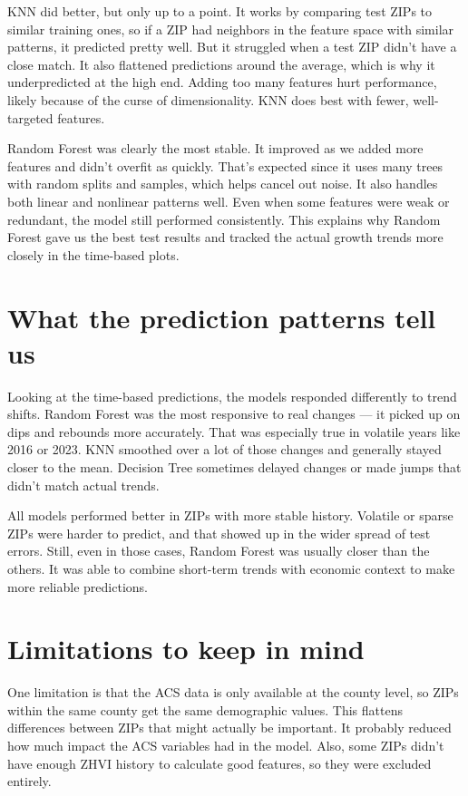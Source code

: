 KNN did better, but only up to a point. It works by comparing test ZIPs to similar training ones, so if a ZIP had neighbors in the feature space with similar patterns, it predicted pretty well. But it struggled when a test ZIP didn’t have a close match. It also flattened predictions around the average, which is why it underpredicted at the high end. Adding too many features hurt performance, likely because of the curse of dimensionality. KNN does best with fewer, well-targeted features.

Random Forest was clearly the most stable. It improved as we added more features and didn’t overfit as quickly. That’s expected since it uses many trees with random splits and samples, which helps cancel out noise. It also handles both linear and nonlinear patterns well. Even when some features were weak or redundant, the model still performed consistently. This explains why Random Forest gave us the best test results and tracked the actual growth trends more closely in the time-based plots.

\section{What the prediction patterns tell us}

Looking at the time-based predictions, the models responded differently to trend shifts. Random Forest was the most responsive to real changes — it picked up on dips and rebounds more accurately. That was especially true in volatile years like 2016 or 2023. KNN smoothed over a lot of those changes and generally stayed closer to the mean. Decision Tree sometimes delayed changes or made jumps that didn’t match actual trends.

All models performed better in ZIPs with more stable history. Volatile or sparse ZIPs were harder to predict, and that showed up in the wider spread of test errors. Still, even in those cases, Random Forest was usually closer than the others. It was able to combine short-term trends with economic context to make more reliable predictions.

\section{Limitations to keep in mind}

One limitation is that the ACS data is only available at the county level, so ZIPs within the same county get the same demographic values. This flattens differences between ZIPs that might actually be important. It probably reduced how much impact the ACS variables had in the model. Also, some ZIPs didn’t have enough ZHVI history to calculate good features, so they were excluded entirely.

